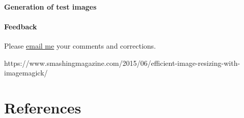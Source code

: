 \documentclass[
  11pt,
  british,
  a4paper,
]{article}
\begin{document}
\hypertarget{generation-of-test-images}{%
\paragraph{Generation of test images}\label{generation-of-test-images}}

\hypertarget{feedback}{%
\paragraph{Feedback}\label{feedback}}

Please \href{mailto:feedback.swanlotus@gmail.com}{email me} your
comments and corrections.

https://www.smashingmagazine.com/2015/06/efficient-image-resizing-with-imagemagick/

\hypertarget{bibliography}{%
\section*{References}\label{bibliography}}
\end{document}
